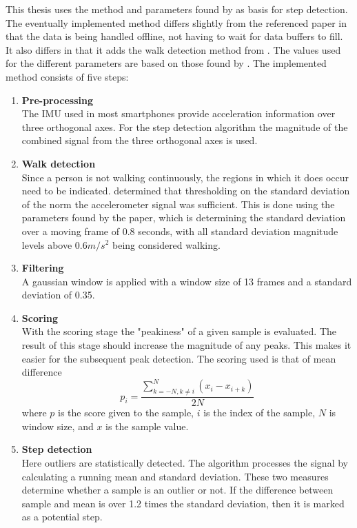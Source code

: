  This thesis uses the method and parameters found by \citet{Salvi2018} as basis for step detection. The eventually implemented method differs slightly from the referenced paper in that the data is being handled offline, not having to wait for data buffers to fill. It also differs in that it adds the walk detection method from \cite{Brajdic2013}. The values used for the different parameters are based on those found by \cite{Salvi2018}. The implemented method consists of five steps:
\begin{enumerate}
	\item \textbf{Pre-processing} \\
	The IMU used in most smartphones provide acceleration information over three orthogonal axes. For the step detection algorithm the magnitude of the combined signal from the three orthogonal axes is used.
	
	\item \textbf{Walk detection} \\
	Since a person is not walking continuously, the regions in which it does occur need to be indicated. \cite{Brajdic2013} determined that thresholding on the standard deviation of the norm the accelerometer signal was sufficient. This is done using the parameters found by the paper, which is determining the standard deviation over a moving frame of 0.8 seconds, with all standard deviation magnitude levels above $0.6 m/s^2$ being considered walking.
	
	\item \textbf{Filtering} \\
	A gaussian window is applied with a window size of 13 frames and a standard deviation of 0.35.
	
	\item \textbf{Scoring }\\
	With the scoring stage the "peakiness" of a given sample is evaluated. The result
	of this stage should increase the magnitude of any peaks. This makes it easier for the subsequent peak detection. The scoring used is that of mean difference 
	\begin{equation}
		p_{i}=\frac{\sum_{k=-N, k \neq i}^{N}\left(x_{i}-x_{i+k}\right)}{2 N}
		\label{eq:mean difference}
	\end{equation}
	where $p$ is the score given to the sample, $i$ is the index of the sample, $N$ is window size, and $x$ is the sample value.
	
	
	\item \textbf{Step detection} \\
	Here outliers are statistically detected. The algorithm processes the signal by calculating a running mean and standard deviation.
	These two measures determine whether a sample is an outlier or not. If the difference between sample and mean is over 1.2 times the standard deviation, then it is marked as a potential step.
	

\end{enumerate}
